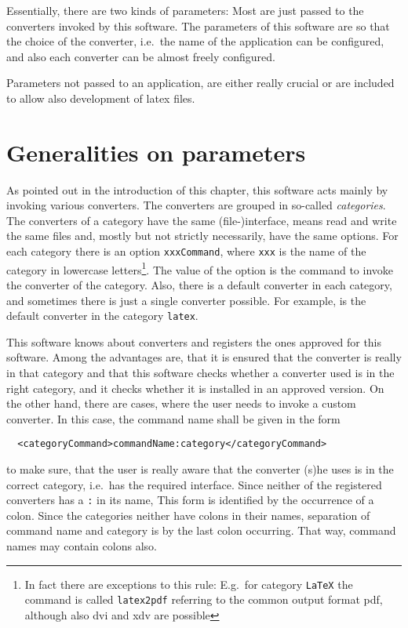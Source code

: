 Essentially, there are two kinds of parameters: 
Most are just passed to the converters invoked by this software. 
The parameters of this software 
are so that the choice of the converter, i.e.~the name of the application 
can be configured, 
and also each converter can be almost freely configured. 

Parameters not passed to an application, 
are either really crucial 
or are included to allow also development of latex files. 

\section{Generalities on parameters}\label{sec:genOnSettings}

As pointed out in the introduction of this chapter, 
this software acts mainly by invoking various converters. 
The converters are grouped in so-called \emph{categories}. 
The converters of a category have the same (file-)interface, %
means read and write the same files and, 
mostly but not strictly necessarily, have the same options. 
For each category there is an option \texttt{xxxCommand}, 
where \texttt{xxx} is the name of the category in lowercase letters\footnote%
{In fact there are exceptions to this rule: E.g.~for category \texttt{LaTeX} 
the command is called \texttt{latex2pdf} referring to the common output format \gls{pdf}, 
although also \gls{dvi} and \gls{xdv} are possible}. 
The value of the option is the command to invoke the converter of the category. 
Also, there is a default converter in each category, 
and sometimes there is just a single converter possible. 
For example, \lualatex{} is the default converter in the category \texttt{latex}. 

This software knows about converters and registers the ones approved for this software. 
Among the advantages are, that it is ensured that the converter is really in that category 
and that this software checks whether a converter used is in the right category, 
and it checks whether it is installed in an approved version. 
On the other hand, there are cases, where the user needs to invoke a custom converter. 
In this case, the command name shall be given in the form 
%
\begin{verbatim}
  <categoryCommand>commandName:category</categoryCommand>
\end{verbatim}
%
to make sure, that the user is really aware that the converter (s)he uses %
is in the correct category, i.e.~has the required interface. 
Since neither of the registered converters has a \texttt{:} in its name, 
This form is identified by the occurrence of a colon. 
Since the categories neither have colons in their names, 
separation of command name and category is by the last colon occurring. 
That way, command names may contain colons also. 

